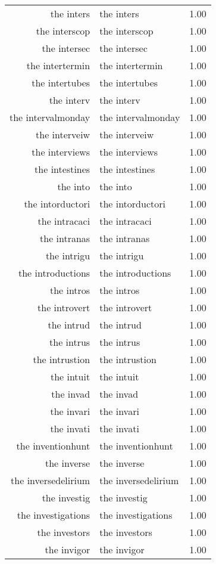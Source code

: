 \begin{table}[ht]
\begin{tabular}{rlr}
  the inters & the inters & 1.00 \\ 
  the interscop & the interscop & 1.00 \\ 
  the intersec & the intersec & 1.00 \\ 
  the intertermin & the intertermin & 1.00 \\ 
  the intertubes & the intertubes & 1.00 \\ 
  the interv & the interv & 1.00 \\ 
  the intervalmonday & the intervalmonday & 1.00 \\ 
  the interveiw & the interveiw & 1.00 \\ 
  the interviews & the interviews & 1.00 \\ 
  the intestines & the intestines & 1.00 \\ 
  the into & the into & 1.00 \\ 
  the intorductori & the intorductori & 1.00 \\ 
  the intracaci & the intracaci & 1.00 \\ 
  the intranas & the intranas & 1.00 \\ 
  the intrigu & the intrigu & 1.00 \\ 
  the introductions & the introductions & 1.00 \\ 
  the intros & the intros & 1.00 \\ 
  the introvert & the introvert & 1.00 \\ 
  the intrud & the intrud & 1.00 \\ 
  the intrus & the intrus & 1.00 \\ 
  the intrustion & the intrustion & 1.00 \\ 
  the intuit & the intuit & 1.00 \\ 
  the invad & the invad & 1.00 \\ 
  the invari & the invari & 1.00 \\ 
  the invati & the invati & 1.00 \\ 
  the inventionhunt & the inventionhunt & 1.00 \\ 
  the inverse & the inverse & 1.00 \\ 
  the inversedelirium & the inversedelirium & 1.00 \\ 
  the investig & the investig & 1.00 \\ 
  the investigations & the investigations & 1.00 \\ 
  the investors & the investors & 1.00 \\ 
  the invigor & the invigor & 1.00 \\ 

\end{tabular}
\end{table}
